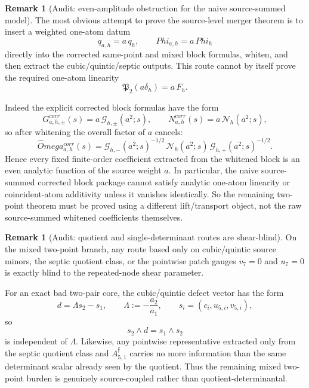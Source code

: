 \documentclass[11pt,a4paper]{amsart}
\def\Omega{Omega}%
\def\Phi{Phi}%
\def\corr{corr}%
\theoremstyle{plain}
\theoremstyle{definition}
\newtheorem{remark}[theorem]{Remark}
\newcommand{\corr}{\mathrm{corr}}
\begin{document}
\begin{remark}[Audit: even-amplitude obstruction for the naive source-summed model]
\label{rem:audit-even-amplitude-obstruction-naive-source-summed-two-point}
The most obvious attempt to prove the source-level merger theorem is to insert a
weighted one-atom datum
\[
q_{a,h}=a\,q_h,
\qquad
\Phi_{a,h}=a\,\Phi_h
\]
directly into the corrected same-point and mixed block formulas, whiten, and
then extract the cubic/quintic/septic outputs. This route cannot by itself
prove the required one-atom linearity
\[
\mathfrak P_2(a\delta_h)=a\,F_h.
\]

Indeed the explicit corrected block formulas have the form
\[
G^{\corr}_{a,h,\pm}(s)=a\,\mathcal G_{h,\pm}(a^2;s),
\qquad
N^{\corr}_{a,h}(s)=a\,\mathcal N_h(a^2;s),
\]
so after whitening the overall factor of $a$ cancels:
\[
\widehat\Omega^{\corr}_{a,h}(s)
=
\mathcal G_{h,-}(a^2;s)^{-1/2}\,
\mathcal N_h(a^2;s)\,
\mathcal G_{h,+}(a^2;s)^{-1/2}.
\]
Hence every fixed finite-order coefficient extracted from the whitened block is
an even analytic function of the source weight $a$. In particular, the naive
source-summed corrected block package cannot satisfy analytic one-atom linearity
or coincident-atom additivity unless it vanishes identically. So the remaining
two-point theorem must be proved using a different lift/transport object, not
the raw source-summed whitened coefficients themselves.
\end{remark}

\begin{remark}[Audit: quotient and single-determinant routes are shear-blind]
\label{rem:audit-shear-blind-two-point-determinantal-routes}
On the mixed two-point branch, any route based only on cubic/quintic source
minors,
the septic quotient class,
or the pointwise patch gauges $v_7=0$ and $u_7=0$ is exactly blind to the
repeated-node shear parameter.

For an exact bad two-pair core, the cubic/quintic defect vector has the form
\[
d=\Lambda s_2-s_1,
\qquad
\Lambda:=-\frac{a_2}{a_1},
\qquad
s_i=(c_i,u_{5,i},v_{5,i}),
\]
so
\[
s_2\wedge d=s_1\wedge s_2
\]
is independent of $\Lambda$. Likewise, any pointwise representative extracted
only from the septic quotient class and $A_{5,1}^{\mathfrak f}$ carries no more
information than the same determinant scalar already seen by the quotient. Thus
the remaining mixed two-point burden is genuinely source-coupled rather than
quotient-determinantal.
\end{remark}
\end{document}
